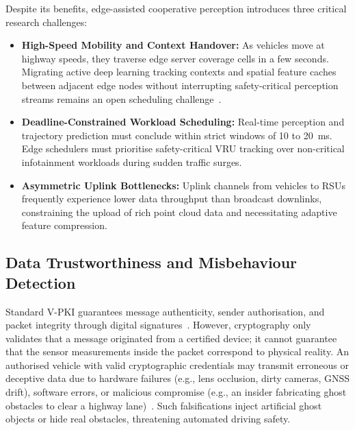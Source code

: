 Despite its benefits, edge-assisted cooperative perception introduces three critical research challenges:
\begin{itemize}
    \item \textbf{High-Speed Mobility and Context Handover:} As vehicles move at highway speeds, they traverse edge server coverage cells in a few seconds.
    Migrating active deep learning tracking contexts and spatial feature caches between adjacent edge nodes without interrupting safety-critical perception streams remains an open scheduling challenge~\cite{zhang2026cooperative}.
    \item \textbf{Deadline-Constrained Workload Scheduling:} Real-time perception and trajectory prediction must conclude within strict windows of 10 to 20~ms.
    Edge schedulers must prioritise safety-critical VRU tracking over non-critical infotainment workloads during sudden traffic surges.
    \item \textbf{Asymmetric Uplink Bottlenecks:} Uplink channels from vehicles to RSUs frequently experience lower data throughput than broadcast downlinks, constraining the upload of rich point cloud data and necessitating adaptive feature compression.
\end{itemize}

\subsection{Data Trustworthiness and Misbehaviour Detection}
\label{subsec:misbehaviour_detection}

Standard V-PKI guarantees message authenticity, sender authorisation, and packet integrity through digital signatures~\cite{brecht2018scms}.
However, cryptography only validates that a message originated from a certified device; it cannot guarantee that the sensor measurements inside the packet correspond to physical reality.
An authorised vehicle with valid cryptographic credentials may transmit erroneous or deceptive data due to hardware failures (e.g., lens occlusion, dirty cameras, GNSS drift), software errors, or malicious compromise (e.g., an insider fabricating ghost obstacles to clear a highway lane)~\cite{haidar2019risk,guo2025autonomous}.
Such falsifications inject artificial ghost objects or hide real obstacles, threatening automated driving safety.

